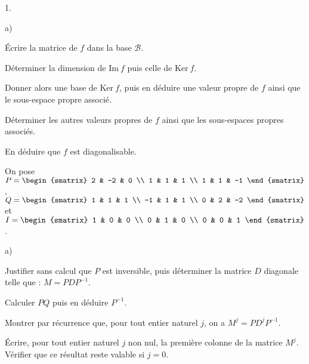 \documentclass[11pt]{article}%
\begin{document}
\begin{noliste}{1.}
 \setlength{\itemsep}{4mm}
\item 
\begin{noliste}{a)}
 \setlength{\itemsep}{2mm}
\item Écrire la matrice de $f$ dans la base $\mathcal{B}$.

\item Déterminer la dimension de Im$~f$ puis celle de Ker$~f$.

\item Donner alors une base de Ker$~f$, puis en déduire une valeur
propre de 
$f$ ainsi que le sous-espace propre associé.

\item Déterminer les autres valeurs propres de $f$ ainsi que les
sous-espaces propres associés.

\item En déduire que $f$ est diagonalisable.
\end{noliste}

\item On pose $P = 
\begin{smatrix}
2 & -2 & 0 \\
1 & 1 & 1 \\
1 & 1 & -1
\end{smatrix}
$, $Q = 
\begin{smatrix}
1 & 1 & 1 \\
-1 & 1 & 1 \\
0 & 2 & -2
\end{smatrix}
$ et $I = 
\begin{smatrix}
1 & 0 & 0 \\
0 & 1 & 0 \\
0 & 0 & 1
\end{smatrix}
$.

\begin{noliste}{a)}
 \setlength{\itemsep}{2mm}
\item Justifier sans calcul que $P$ est inversible, puis déterminer la
matrice $D$ diagonale telle que : $M = PDP^{-1}$.

\item Calculer $PQ$ puis en déduire $P^{-1}$.

\item Montrer par récurrence que, pour tout entier naturel $j$, on a
$M^{j} = PD^{j}P^{-1}$.

\item Écrire, pour tout entier naturel $j$ non nul, la première colonne
de
la matrice $M^{j}$. Vérifier que ce résultat reste valable si $j = 0$.
\end{noliste}
\end{noliste}
\end{document}
